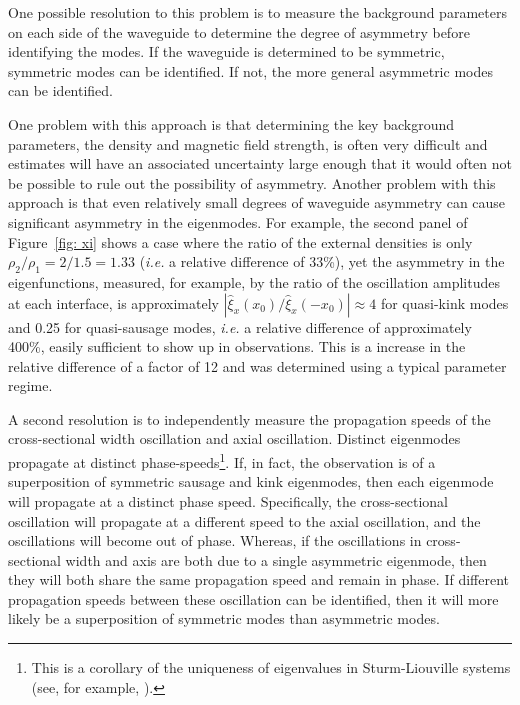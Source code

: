 \documentclass[12pt,draft]{../style-files/ociamthesis}
\begin{document}
One possible resolution to this problem is to measure the background parameters on each side of the waveguide to determine the degree of asymmetry before identifying the modes. If the waveguide is determined to be symmetric, symmetric modes can be identified. If not, the more general asymmetric modes can be identified.

One problem with this approach is that determining the key background parameters, the density and magnetic field strength, is often very difficult and estimates will have an associated uncertainty large enough that it would often not be possible to rule out the possibility of asymmetry. Another problem with this approach is that even relatively small degrees of waveguide asymmetry can cause significant asymmetry in the eigenmodes. For example, the second panel of Figure~\ref{fig: xi} shows a case where the ratio of the external densities is only $\rho_2 / \rho_1 = 2/1.5 = 1.33$ (\textit{i.e.} a relative difference of 33\%), yet the asymmetry in the eigenfunctions, measured, for example, by the ratio of the oscillation amplitudes at each interface, is approximately $|\hat{\xi}_x(x_0) / \hat{\xi}_x(-x_0)| \approx 4$ for quasi-kink modes and 0.25 for quasi-sausage modes, \textit{i.e.} a relative difference of approximately 400\%, easily sufficient to show up in observations. This is a increase in the relative difference of a factor of 12 and was determined using a typical parameter regime.

A second resolution is to independently measure the propagation speeds of the cross-sectional width oscillation and axial oscillation. Distinct eigenmodes propagate at distinct phase-speeds\footnote{This is a corollary of the uniqueness of eigenvalues in Sturm-Liouville systems (see, for example, \citealp{boy_etal12}).}. If, in fact, the observation is of a superposition of symmetric sausage and kink eigenmodes, then each eigenmode will propagate at a distinct phase speed. Specifically, the cross-sectional oscillation will propagate at a different speed to the axial oscillation, and the oscillations will become out of phase. Whereas, if the oscillations in cross-sectional width and axis are both due to a single asymmetric eigenmode, then they will both share the same propagation speed and remain in phase. If different propagation speeds between these oscillation can be identified, then it will more likely be a superposition of symmetric modes than asymmetric modes.
\end{document}
